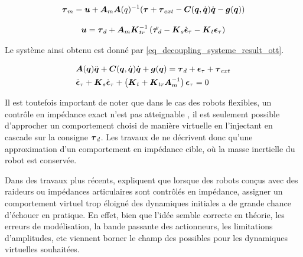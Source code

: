 \begin{equation} \label{eq_feedback_compensation_ott}
	\vect{\tau}_m = \vect{u} + \matr{A}_m\matr{A}(q)^{-1} (\vect{\tau} + \vect{\tau}_{ext} - \matr{C}(\vect{q}, \dot{\vect{q}})\dot{\vect{q}} - \vect{g}(\vect{q}))
\end{equation}

\begin{equation} \label{eq_decoupling_inner_torque_ott}
	\vect{u} = \vect{\tau}_d + \matr{A}_m \matr{K}_{tr}^{-1} \left(\ddot{\vect{\tau}_d} - \matr{K}_s \dot{\vect{\epsilon}}_\tau -\matr{K}_t \vect{\epsilon}_\tau \right) 
\end{equation}

Le système ainsi obtenu est donné par \cref{eq_decoupling_systeme_result_ott}.

\begin{equation} \label{eq_decoupling_systeme_result_ott}
	\begin{split}
		&\matr{A}(\vect{q})\ddot{\vect{q}} + \matr{C}(\vect{q}, \dot{\vect{q}})\dot{\vect{q}} + \vect{g}(\vect{q}) = \vect{\tau}_d + \vect{\epsilon}_\tau + \vect{\tau}_{ext} \\
		&\ddot{\vect{\epsilon}}_\tau + \matr{K}_s\dot{\vect{\epsilon}}_\tau + \left(\matr{K}_t + \matr{K}_{tr}\matr{A}_m^{-1} \right)\vect{\epsilon}_\tau = 0\\
	\end{split}
\end{equation}

Il est toutefois important de noter que dans le cas des robots flexibles, un contrôle en impédance exact n'est pas atteignable \parencite{ott_decoupling_2003}, il est seulement possible d'approcher un comportement choisi de manière virtuelle en l'injectant en cascade sur la consigne $\vect{\tau}_d$. Les travaux de \textcite{ott_decoupling_2003} ne décrivent donc qu'une approximation d'un comportement en impédance cible, où la masse inertielle du robot est conservée.

Dans des travaux plus récents, \textcite{keppler_elastic_2018, keppler_elastic_2018b} %
expliquent que lorsque des robots conçus avec des raideurs ou impédances articulaires sont contrôlés en impédance, assigner un comportement virtuel trop éloigné des dynamiques initiales a de grande chance d'échouer en pratique. En effet, bien que l'idée semble correcte en théorie, les erreurs de modélisation, la bande passante des actionneurs, les limitations d'amplitudes, etc \parencite{keppler_elastic_2018} viennent borner le champ des possibles pour les dynamiques virtuelles souhaitées. 

